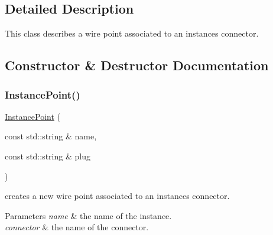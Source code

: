 \subsection{Detailed Description}
This class describes a wire point associated to an instance\textquotesingle{}s connector. 

\subsection{Constructor \& Destructor Documentation}
\mbox{\label{class_open_chams_1_1_instance_point_a1f3b6eda5ef7bb872c96f006021a61f1}} 
\subsubsection{\texorpdfstring{Instance\+Point()}{InstancePoint()}}
{\footnotesize\ttfamily \mbox{\hyperlink{class_open_chams_1_1_instance_point}{Instance\+Point}} (\begin{DoxyParamCaption}\item[{const std\+::string \&}]{name,  }\item[{const std\+::string \&}]{plug }\end{DoxyParamCaption})\hspace{0.3cm}{\ttfamily [inline]}}



creates a new wire point associated to an instance\textquotesingle{}s connector. 


\begin{DoxyParams}{Parameters}
{\em name} & the name of the instance. \\
\hline
{\em connector} & the name of the connector. \\
\hline
\end{DoxyParams}
